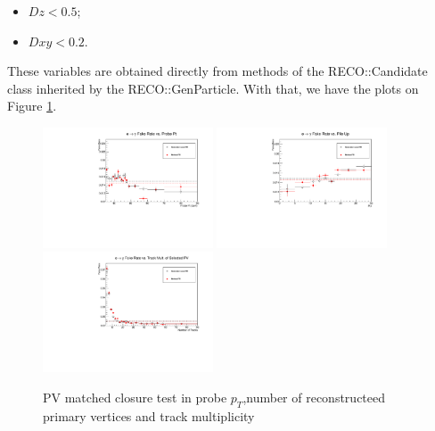 \begin{itemize}
\item $Dz < 0.5$;
\item $Dxy < 0.2$.
\end{itemize}

These variables are obtained directly from methods of the RECO::Candidate class inherited by the RECO::GenParticle.
With that, we have the plots on Figure \ref{closure_all}.

\begin{figure}[H]
\begin{center}
{\label{closure_pt}\includegraphics[width=0.45\textwidth]{efake_figs/closure_pt.pdf}}
{\label{closure_pu}\includegraphics[width=0.45\textwidth]{efake_figs/closure_pu.pdf}}
\\
{\label{closure_ntrk}\includegraphics[width=0.45\textwidth]{efake_figs/closure_trk.pdf}}
\caption{PV matched closure test in probe $p_T$,number of reconstructeed primary vertices and track multiplicity}
\label{closure_all}
\end{center}
\end{figure}


